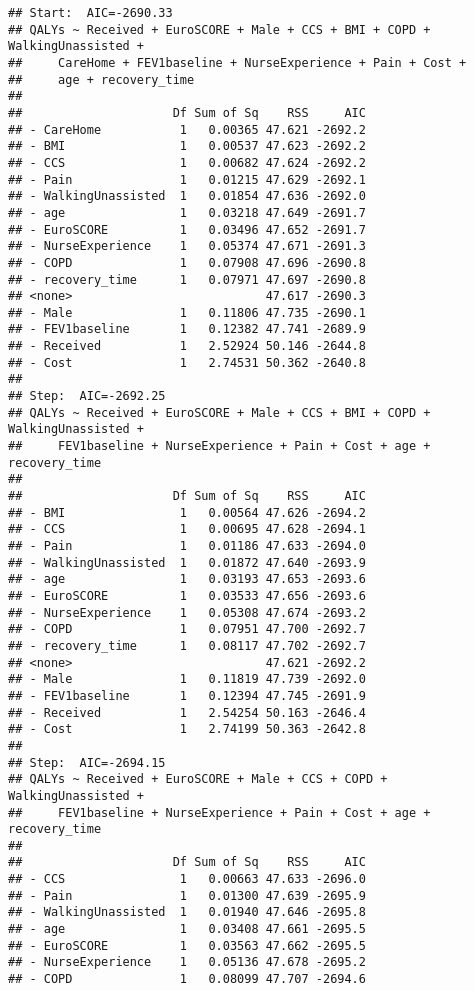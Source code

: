 \documentclass[
]{article}
\begin{document}
\begin{verbatim}
## Start:  AIC=-2690.33
## QALYs ~ Received + EuroSCORE + Male + CCS + BMI + COPD + WalkingUnassisted + 
##     CareHome + FEV1baseline + NurseExperience + Pain + Cost + 
##     age + recovery_time
## 
##                     Df Sum of Sq    RSS     AIC
## - CareHome           1   0.00365 47.621 -2692.2
## - BMI                1   0.00537 47.623 -2692.2
## - CCS                1   0.00682 47.624 -2692.2
## - Pain               1   0.01215 47.629 -2692.1
## - WalkingUnassisted  1   0.01854 47.636 -2692.0
## - age                1   0.03218 47.649 -2691.7
## - EuroSCORE          1   0.03496 47.652 -2691.7
## - NurseExperience    1   0.05374 47.671 -2691.3
## - COPD               1   0.07908 47.696 -2690.8
## - recovery_time      1   0.07971 47.697 -2690.8
## <none>                           47.617 -2690.3
## - Male               1   0.11806 47.735 -2690.1
## - FEV1baseline       1   0.12382 47.741 -2689.9
## - Received           1   2.52924 50.146 -2644.8
## - Cost               1   2.74531 50.362 -2640.8
## 
## Step:  AIC=-2692.25
## QALYs ~ Received + EuroSCORE + Male + CCS + BMI + COPD + WalkingUnassisted + 
##     FEV1baseline + NurseExperience + Pain + Cost + age + recovery_time
## 
##                     Df Sum of Sq    RSS     AIC
## - BMI                1   0.00564 47.626 -2694.2
## - CCS                1   0.00695 47.628 -2694.1
## - Pain               1   0.01186 47.633 -2694.0
## - WalkingUnassisted  1   0.01872 47.640 -2693.9
## - age                1   0.03193 47.653 -2693.6
## - EuroSCORE          1   0.03533 47.656 -2693.6
## - NurseExperience    1   0.05308 47.674 -2693.2
## - COPD               1   0.07951 47.700 -2692.7
## - recovery_time      1   0.08117 47.702 -2692.7
## <none>                           47.621 -2692.2
## - Male               1   0.11819 47.739 -2692.0
## - FEV1baseline       1   0.12394 47.745 -2691.9
## - Received           1   2.54254 50.163 -2646.4
## - Cost               1   2.74199 50.363 -2642.8
## 
## Step:  AIC=-2694.15
## QALYs ~ Received + EuroSCORE + Male + CCS + COPD + WalkingUnassisted + 
##     FEV1baseline + NurseExperience + Pain + Cost + age + recovery_time
## 
##                     Df Sum of Sq    RSS     AIC
## - CCS                1   0.00663 47.633 -2696.0
## - Pain               1   0.01300 47.639 -2695.9
## - WalkingUnassisted  1   0.01940 47.646 -2695.8
## - age                1   0.03408 47.661 -2695.5
## - EuroSCORE          1   0.03563 47.662 -2695.5
## - NurseExperience    1   0.05136 47.678 -2695.2
## - COPD               1   0.08099 47.707 -2694.6

\end{verbatim}
\end{document}
